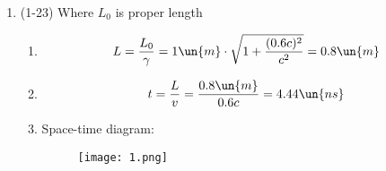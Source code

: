 \documentclass{physicsHW}
\begin{document}
\begin{enumerate}
\item (1-23) Where $L_0$ is proper length
	\begin{enumerate}
		\item \[L = \frac{L_0}{\gamma} = 1 \un{m} \cdot \sqrt{1 + \frac{(0.6c)^2} {c^2}} = 0.8 \un{m}\]
		\item \[t = \frac{L} {v} = \frac{0.8\un{m}} {0.6c} = 4.44 \un{ns} \]
		\item Space-time diagram: 
			\leavevmode\vadjust{\vspace{-\baselineskip}}\newline
			\begin{figure}[ht]
			\centering
			\texttt{[image: 1.png]}
			\end{figure}
			\end{enumerate}

			

\end{enumerate}
\end{document}
